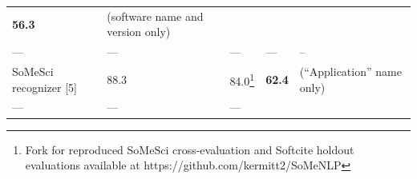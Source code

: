 \documentclass[
]{article}
\begin{document}
\begin{longtable}[]{@{}lllll@{}}
\begin{minipage}[t]{0.18\columnwidth}
\textbf{56.3}\strut
\end{minipage} & \begin{minipage}[t]{0.12\columnwidth}\raggedright
(software name and version only)\strut
\end{minipage}\tabularnewline
\begin{minipage}[t]{0.18\columnwidth}\raggedright
---\strut
\end{minipage} & \begin{minipage}[t]{0.18\columnwidth}\raggedright
---\strut
\end{minipage} & \begin{minipage}[t]{0.18\columnwidth}\raggedright
---\strut
\end{minipage} & \begin{minipage}[t]{0.18\columnwidth}\raggedright
---\strut
\end{minipage} & \begin{minipage}[t]{0.12\columnwidth}\raggedright
--\strut
\end{minipage}\tabularnewline
\begin{minipage}[t]{0.18\columnwidth}\raggedright
SoMeSci recognizer {[}5{]}\strut
\end{minipage} & \begin{minipage}[t]{0.18\columnwidth}\raggedright
88.3\strut
\end{minipage} & \begin{minipage}[t]{0.18\columnwidth}\raggedright
84.0\footnote{Fork for reproduced SoMeSci cross-evaluation and Softcite
  holdout evaluations available at https://github.com/kermitt2/SoMeNLP}\strut
\end{minipage} & \begin{minipage}[t]{0.18\columnwidth}\raggedright
\textbf{62.4}\strut
\end{minipage} & \begin{minipage}[t]{0.12\columnwidth}\raggedright
(``Application'' name only)\strut
\end{minipage}\tabularnewline
\begin{minipage}[t]{0.18\columnwidth}\raggedright
---\strut
\end{minipage} & \begin{minipage}[t]{0.18\columnwidth}\raggedright
---\strut
\end{minipage} & \begin{minipage}[t]{0.18\columnwidth}\raggedright
---\strut
\end{minipage} & \begin{minipage}[t]{0.18\columnwidth}\raggedright

\end{minipage}
\end{longtable}
\end{document}

